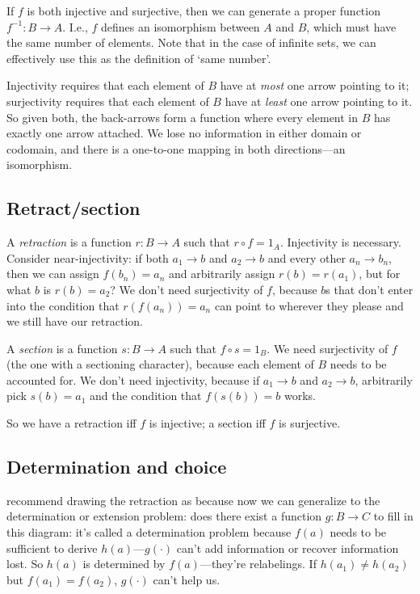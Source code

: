 \documentclass[11pt]{article}
\begin{document}
If $f$ is both injective and surjective, then we can generate a proper function
$f^{-1}:B\to A$. I.e., $f$ defines an isomorphism between $A$ and $B$, which must have
the same number of elements. Note that in the case of infinite sets, we can effectively
use this as the definition of `same number'.

Injectivity requires that each element of $B$ have at {\em most} one arrow pointing
to it; surjectivity requires that each element of $B$ have at {\em least} one arrow
pointing to it.  So given both, the back-arrows form a function where every element in
$B$ has exactly one arrow attached. We lose no information in either domain or codomain,
and there is a one-to-one mapping in both directions---an isomorphism.

\subsection{Retract/section}
A {\em retraction} is a function $r:B\to A$ such that $r\circ f=1_A$. Injectivity is
necessary. Consider near-injectivity: if both $a_1\to b$ and $a_2\to b$ and every other
$a_n\to b_n$, then we can assign $f(b_n)=a_n$ and arbitrarily assign $r(b)=r(a_1)$,
but for what $b$ is $r(b)=a_2$?  We don't need surjectivity of $f$, because $b$s that
don't enter into the condition that $r(f(a_n))=a_n$ can point to wherever they please
and we still have our retraction.

A {\em section} is a function $s:B\to A$ such that $f\circ s=1_B$. We need surjectivity of
$f$ (the one with a sectioning character), because each element of $B$ needs to
be accounted for. We don't need injectivity, because if $a_1\to b$ and $a_2\to b$,
arbitrarily pick $s(b)=a_1$ and the condition that $f(s(b))=b$ works.

So we have a retraction iff $f$ is injective; a section iff $f$ is surjective.

\subsection{Determination and choice}

\cite{lawvere:conceptual} recommend drawing the retraction as
because now we can generalize to the determination or extension problem: does there exist
a function $g:B\to C$ to fill in this diagram:
it's called a determination problem because $f(a)$ needs to be sufficient to derive
$h(a)$---$g(\cdot)$ can't add information or recover information lost. So $h(a)$ is
determined by $f(a)$---they're relabelings. If $h(a_1)\neq h(a_2)$ but $f(a_1)=f(a_2)$, $g(\cdot)$ can't
help us.
\end{document}
